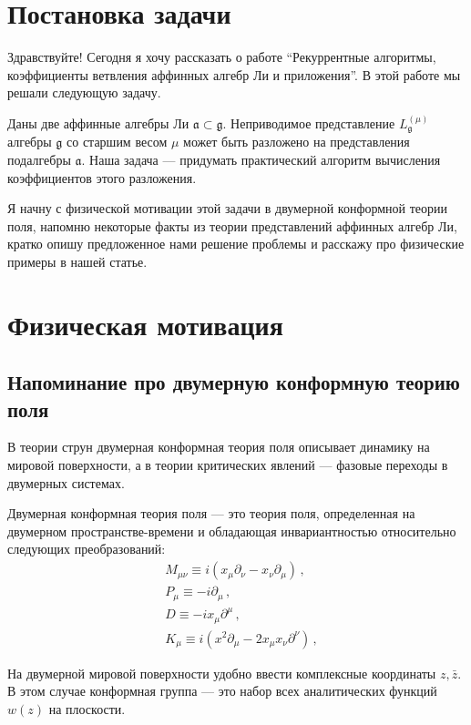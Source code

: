 \documentclass[a4paper,12pt]{article}
\theoremstyle{definition} \newtheorem{Def}{Definition}
\begin{document}
\section{Постановка задачи}
\label{sec:task}

Здравствуйте!
Сегодня я хочу рассказать о работе ``Рекуррентные алгоритмы, коэффициенты ветвления аффинных алгебр
Ли и приложения''. В этой работе мы решали следующую задачу.

Даны две аффинные алгебры Ли $\mathfrak{a}\subset \mathfrak{g}$. Неприводимое представление
$L^{(\mu)}_{\mathfrak{g}}$ алгебры $\mathfrak{g}$ со старшим весом $\mu$ может быть разложено на
представления подалгебры $\mathfrak{a}$. Наша задача --- придумать практический алгоритм вычисления
коэффициентов этого разложения. 

Я начну с физической мотивации этой задачи в двумерной конформной теории поля, напомню некоторые
факты из теории представлений аффинных алгебр Ли, кратко опишу предложенное нами решение проблемы и
расскажу про физические примеры в нашей статье.

\section{Физическая мотивация}
\label{sec:physics}

\subsection{Напоминание про двумерную конформную теорию поля}
\label{sec:CFT}

В теории струн двумерная конформная теория поля описывает динамику на мировой поверхности, а в
теории критических явлений --- фазовые переходы в двумерных системах.

Двумерная конформная теория поля --- это теория поля, определенная на двумерном пространстве-времени
и обладающая инвариантностью относительно следующих преобразований:
\begin{align}
  \label{eq:1}
  & M_{\mu\nu} \equiv i(x_\mu\partial_\nu-x_\nu\partial_\mu) \,, \\
  &P_\mu \equiv-i\partial_\mu \,, \\
  &D \equiv-ix_\mu\partial^\mu \,, \\
  &K_\mu \equiv i(x^2\partial_\mu-2x_\mu x_\nu\partial^\nu) \,,
\end{align}

На двумерной мировой поверхности удобно ввести комплексные координаты $z,\bar{z}$. 
В этом случае конформная группа --- это набор всех аналитических функций $w(z)$ на плоскости. 
\end{document}
